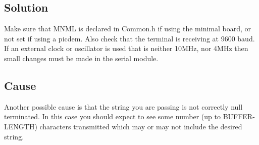 \documentclass[]{report}
\begin{document}
\subsection{Solution}
Make sure that MNML is declared in Common.h if using the minimal board,
or not set if using a picdem. Also check that the terminal is receiving at 9600
baud. If an external clock or oscillator is used that is neither 10MHz, nor 4MHz
then small changes must be made in the serial module.

\subsection{Cause}
Another possible cause is that the string you are passing is not correctly null
terminated. In this case you should expect to see some number (up to BUFFER-
LENGTH) characters transmitted which may or may not include the desired
string.
\end{document}
